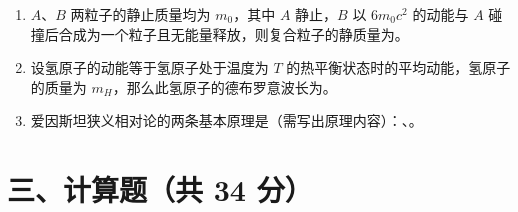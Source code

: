 \documentclass[zihao=5,a4paper,UTF8]{ctexart}
\newcommand{\blank}[1][2.5cm]{\underline{\hspace{#1}}}
\begin{document}
\begin{enumerate}[leftmargin=2em, itemsep=6pt, start=11]
    \item $A$、$B$ 两粒子的静止质量均为 $m_0$，其中 $A$ 静止，$B$ 以 $6m_0c^2$ 的动能与 $A$ 碰撞后合成为一个粒子且无能量释放，则复合粒子的静质量为\blank[2.5cm]。

    \item 设氢原子的动能等于氢原子处于温度为 $T$ 的热平衡状态时的平均动能，氢原子的质量为 $m_H$，那么此氢原子的德布罗意波长为\blank[3.5cm]。

    \item 爱因斯坦狭义相对论的两条基本原理是（需写出原理内容）：\blank[5cm]、\blank[5cm]。
\end{enumerate}

\section*{三、计算题（共 34 分）}
\end{document}
